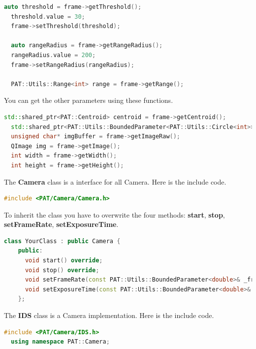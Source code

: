 \begin{lstlisting}[language=c++, gobble=2]
  auto threshold = frame->getThreshold();
  threshold.value = 30;
  frame->setThreshold(threshold);
  
  auto rangeRadius = frame->getRangeRadius();
  rangeRadius.value = 200;
  frame->setRangeRadius(rangeRadius);
  
  PAT::Utils::Range<int> range = frame->getRange();
\end{lstlisting}

You can get the other parameters using these functions.

\begin{lstlisting}[language=c++, gobble=2]
  std::shared_ptr<PAT::Centroid> centroid = frame->getCentroid();
  std::shared_ptr<PAT::Utils::BoundedParameter<PAT::Utils::Circle<int>>> target = frame->getTarget();
  unsigned char* imgBuffer = frame->getImageRaw();
  QImage img = frame->getImage();
  int width = frame->getWidth();
  int height = frame->getHeight();
\end{lstlisting}


The \textbf{Camera} class is a interface for all Camera. Here is the
include code.

\begin{lstlisting}[language=c++, gobble=2]
  #include <PAT/Camera/Camera.h>
\end{lstlisting}

To inherit the class you have to overwrite the four methods:
\textbf{start}, \textbf{stop}, \textbf{setFrameRate},
\textbf{setExposureTime}.

\begin{lstlisting}[language=c++, gobble=2]
  class YourClass : public Camera {
    public:
      void start() override;
      void stop() override;
      void setFrameRate(const PAT::Utils::BoundedParameter<double>& _frameRate) override;
      void setExposureTime(const PAT::Utils::BoundedParameter<double>& _exposureTimeValue) override;
    };
\end{lstlisting}


The \textbf{IDS} class is a Camera implementation. Here is the include
code.

\begin{lstlisting}[language=c++, gobble=2]
  #include <PAT/Camera/IDS.h>
  using namespace PAT::Camera;
\end{lstlisting}

